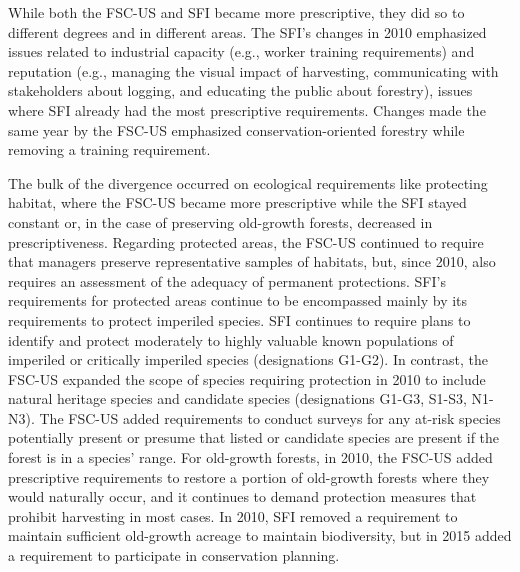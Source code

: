 \documentclass[
      12pt,
            Review ]{article}
\begin{document}


While both the FSC-US and SFI became more prescriptive, they did so to
different degrees and in different areas. The SFI's changes in 2010
emphasized issues related to industrial capacity (e.g., worker training
requirements) and reputation (e.g., managing the visual impact of
harvesting, communicating with stakeholders about logging, and educating
the public about forestry), issues where SFI already had the most
prescriptive requirements. Changes made the same year by the FSC-US
emphasized conservation-oriented forestry while removing a training
requirement.

The bulk of the divergence occurred on ecological requirements like
protecting habitat, where the FSC-US became more prescriptive while the
SFI stayed constant or, in the case of preserving old-growth forests,
decreased in prescriptiveness. Regarding protected areas, the FSC-US
continued to require that managers preserve representative samples of
habitats, but, since 2010, also requires an assessment of the adequacy
of permanent protections. SFI's requirements for protected areas
continue to be encompassed mainly by its requirements to protect
imperiled species. SFI continues to require plans to identify and
protect moderately to highly valuable known populations of imperiled or
critically imperiled species (designations G1-G2). In contrast, the
FSC-US expanded the scope of species requiring protection in 2010 to
include natural heritage species and candidate species (designations
G1-G3, S1-S3, N1-N3). The FSC-US added requirements to conduct surveys
for any at-risk species potentially present or presume that listed or
candidate species are present if the forest is in a species' range. For
old-growth forests, in 2010, the FSC-US added prescriptive requirements
to restore a portion of old-growth forests where they would naturally
occur, and it continues to demand protection measures that prohibit
harvesting in most cases. In 2010, SFI removed a requirement to maintain
sufficient old-growth acreage to maintain biodiversity, but in 2015
added a requirement to participate in conservation planning.
\end{document}
